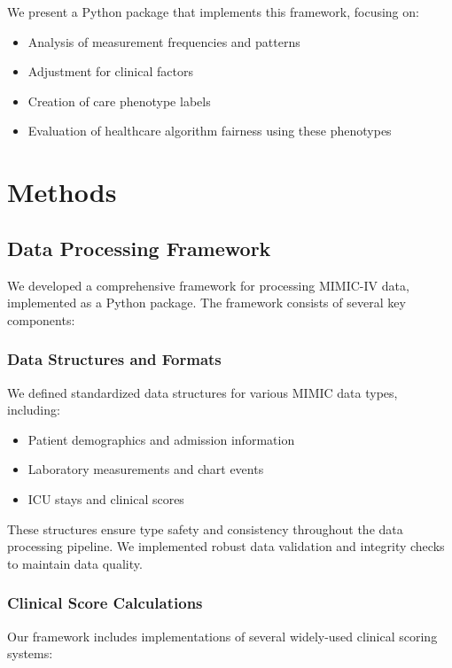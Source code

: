 \documentclass[12pt]{article}
\begin{document}
We present a Python package that implements this framework, focusing on:
\begin{itemize}
    \item Analysis of measurement frequencies and patterns
    \item Adjustment for clinical factors
    \item Creation of care phenotype labels
    \item Evaluation of healthcare algorithm fairness using these phenotypes
\end{itemize}

\section{Methods}

\subsection{Data Processing Framework}

We developed a comprehensive framework for processing MIMIC-IV data, implemented as a Python package. The framework consists of several key components:

\subsubsection{Data Structures and Formats}

We defined standardized data structures for various MIMIC data types, including:
\begin{itemize}
    \item Patient demographics and admission information
    \item Laboratory measurements and chart events
    \item ICU stays and clinical scores
\end{itemize}

These structures ensure type safety and consistency throughout the data processing pipeline. We implemented robust data validation and integrity checks to maintain data quality.

\subsubsection{Clinical Score Calculations}

Our framework includes implementations of several widely-used clinical scoring systems:
\end{document}
